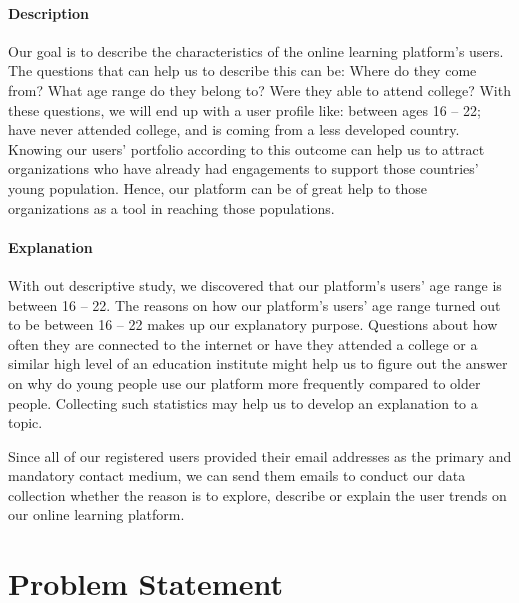 \paragraph{Description}
Our goal is to describe the characteristics of the online learning platform's users. The questions that can help us to describe this can be: Where do they come from? What age range do they belong to? Were they able to attend college? With these questions, we will end up with a user profile like: between ages 16 -- 22; have never attended college, and is coming from a less developed country. Knowing our users' portfolio according to this outcome can help us to attract organizations who have already had engagements to support those countries' young population. Hence, our platform can be of great help to those organizations as a tool in reaching those populations.

\paragraph{Explanation}
With out descriptive study, we discovered that our platform's users' age range is between 16 -- 22. The reasons on how our platform's users' age range turned out to be between 16 -- 22 makes up our explanatory purpose. Questions about how often they are connected to the internet or have they attended a college or a similar high level of an education institute might help us to figure out the answer on why do young people use our platform more frequently compared to older people. Collecting such statistics may help us to develop an explanation to a topic.

\vspace{1cm}
Since all of our registered users provided their email addresses as the primary and mandatory contact medium, we can send them emails to conduct our data collection whether the reason is to explore, describe or explain the user trends on our online learning platform.

\section{Problem Statement}
\label{sec:2:Problem}

